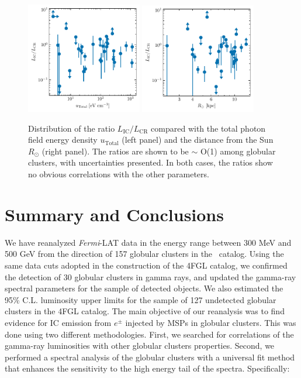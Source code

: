 \documentclass[doublespace,nopageskip]{VTthesis}
\begin{document}
\begin{figure}
    \centering
    \includegraphics[width=0.45\textwidth]{Figures/Globular/ratio_urad.pdf}
    \includegraphics[width=0.45\textwidth]{Figures/Globular/ratio_Rsun.pdf}
    \caption{Distribution of the ratio $L_\mathrm{IC}/L_\mathrm{CR}$ compared with the total photon field energy density $u_\mathrm{Total}$ (left panel) and the distance from the Sun $R_\odot$ (right panel). The ratios are shown to be $\sim$ O(1) among globular clusters, with uncertainties presented. In both cases, the ratios show no obvious correlations with the other parameters.}
    \label{fig:fe}
\end{figure}

\section{Summary and Conclusions}\label{sec:conclusion}

We have reanalyzed \textit{Fermi}-LAT data in the energy range between 300 MeV and 500 GeV from the direction of 157 globular clusters in the~\citet{1996AJ....112.1487H} catalog. Using the same data cuts adopted in the construction of the 4FGL catalog, we confirmed the detection of 30 globular clusters in gamma rays, and updated the gamma-ray spectral parameters for the sample of detected objects. We also estimated the 95\% C.L. luminosity upper limits for the sample of 127 undetected globular clusters in the 4FGL catalog. The main objective of our reanalysis was to find evidence for IC emission from $e^{\pm}$ injected by MSPs in globular clusters. This was done using two different methodologies. First, we searched for correlations of the gamma-ray luminosities with other globular clusters properties. Second, we performed a spectral analysis of the globular clusters with a universal fit method that enhances the sensitivity to the high energy tail of the spectra. Specifically:
\end{document}
